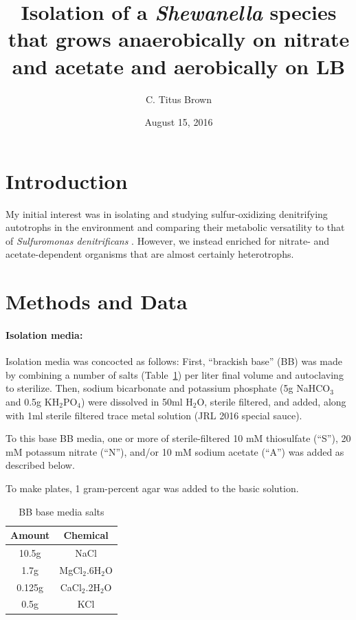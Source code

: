 \documentclass{article}
\begin{document}
\title{Isolation of a {\em Shewanella} species that grows
  anaerobically on nitrate and acetate and aerobically on LB}
\author{C. Titus Brown}
\date{August 15, 2016}

\maketitle

\section*{Introduction}

My initial interest was in isolating and studying sulfur-oxidizing
denitrifying autotrophs in the environment and comparing their
metabolic versatility to that of {\em Sulfuromonas denitrificans}
\cite{sievert2008genome}.  However, we instead enriched for nitrate-
and acetate-dependent organisms that are almost certainly
heterotrophs.

\section*{Methods and Data}

\paragraph{Isolation media:} Isolation media was concocted as follows:
First, ``brackish base'' (BB) was made by combining a number of salts
(Table~\ref{tab:media}) per liter final volume and autoclaving to
sterilize.  Then, sodium bicarbonate and potassium phosphate (5g
NaHCO$_3$ and 0.5g KH$_2$PO$_4$) were dissolved in 50ml H$_2$O,
sterile filtered, and added, along with 1ml sterile filtered trace
metal solution (JRL 2016 special sauce).

To this base BB media, one or more of sterile-filtered 10 mM
thiosulfate (``S''), 20 mM potassum nitrate (``N''), and/or 10 mM
sodium acetate (``A'') was added as described below.

To make plates, 1 gram-percent agar was added to the basic solution.

\begin{table}
\centering
\begin{tabular}{|c|c|}
\hline
Amount & Chemical \\
\hline
10.5g & NaCl \\
1.7g & MgCl$_2$.6H$_2$O \\
0.125g & CaCl$_2$.2H$_2$O \\
0.5g & KCl \\
\hline
\end{tabular}
\caption{BB base media salts}
\label{tab:media}
\end{table}
\end{document}
